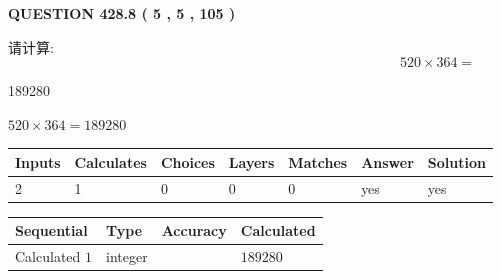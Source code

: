 \documentclass{ctexart}
\begin{document}
   
  
\vspace{0.2in}
  
{\textbf{\Large{QUESTION
428.8 
 ( 5 , 5 , 105 )
}}}
  
  
 
请计算:
\begin{equation}
520  \times    %
364 = \nonumber
\end{equation}
 
 
 
\noindent{}
 
 

189280
 
 
\noindent{}
 
 

 
 
 
\noindent{}
 
 

$ %
520 \times  %
364=   %
189280$
 
 
\noindent{}
 
 

 
   
   
   
   
\noindent\begin{tabular}{|l|l|l|l|l|l|l|}
 \hline
Inputs & Calculates & Choices & Layers & Matches & Answer & Solution \\ \hline
 2  & 
 1  & 
 0
  & 
 0  & 
 0  & 
  yes & 
  yes 
  \\ \hline
 \end{tabular}
   
   
   
   
\noindent{}
   
   
  
  
\noindent\begin{tabular}{|l|l|l|l|}
\hline
 Sequential & Type & Accuracy & Calculated \\ 
\hline
 
 
  Calculated $  1 $ & integer &  & 
  $ 189280 $ 
 \\  \hline  
 \end{tabular}
   
\end{document}
